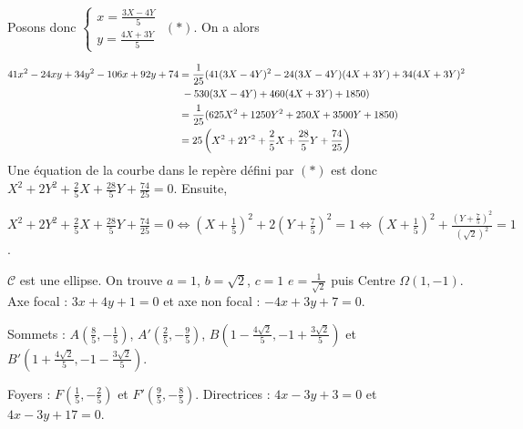 {\begin{enumerate}
{{Posons donc $\left\{
\begin{array}{l}
x=\frac{3X-4Y}{5}\\
y=\frac{4X+3Y}{5}
\end{array}\right.$ $(*)$. On a alors

\begin{align*}\ensuremath
41x^2-24xy+34y^2-106x+92y+74&=\frac{1}{25}(41(3X-4Y)^2-24(3X-4Y)(4X+3Y)+34(4X+3Y)^2\\
 &\;-530(3X-4Y)+460(4X+3Y)+1850)\\
 &=\frac{1}{25}(625X^2+1250Y^2+250X+3500Y+1850)\\
 &=25\left(X^2+2Y^2+\frac{2}{5}X+\frac{28}{5}Y+\frac{74}{25}\right)
\end{align*}
Une équation de la courbe dans le repère défini par $(*)$ est donc
$X^2+2Y^2+\frac{2}{5}X+\frac{28}{5}Y+\frac{74}{25}=0$. Ensuite,

\begin{center}
$X^2+2Y^2+\frac{2}{5}X+\frac{28}{5}Y+\frac{74}{25}=0\Leftrightarrow\left(X+\frac{1}{5}\right)^2+2\left(Y+\frac{7}{5}\right)^2=1\Leftrightarrow\left(X+\frac{1}{5}\right)^2+\frac{\left(Y+\frac{7}{5}\right)^2}{\left(\sqrt{2}\right)^2}=1$.
\end{center}
$\mathcal{C}$ est une ellipse. On trouve $a=1$, $b=\sqrt{2}$, $c=1$ $e=\frac{1}{\sqrt{2}}$ puis
Centre $\Omega\left(1,-1\right)$. Axe focal : $3x+4y+1=0$ et axe non focal : $-4x+3y+7=0$.

Sommets : $A\left(\frac{8}{5},-\frac{1}{5}\right)$, $A'\left(\frac{2}{5},-\frac{9}{5}\right)$, $B\left(1-\frac{4\sqrt{2}}{5},-1+\frac{3\sqrt{2}}{5}\right)$ et $B'\left(1+\frac{4\sqrt{2}}{5},-1-\frac{3\sqrt{2}}{5}\right)$.

Foyers : $F\left(\frac{1}{5},-\frac{2}{5}\right)$ et $F'\left(\frac{9}{5},-\frac{8}{5}\right)$. Directrices : $4x-3y+3=0$ et $4x-3y+17=0$.}
  \item {}}
\end{enumerate}}
